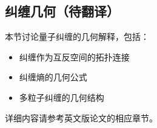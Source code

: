 
\subsection{纠缠几何（待翻译）}

本节讨论量子纠缠的几何解释，包括：
\begin{itemize}
    \item 纠缠作为互反空间的拓扑连接
    \item 纠缠熵的几何公式
    \item 多粒子纠缠的几何结构
\end{itemize}

详细内容请参考英文版论文的相应章节。
